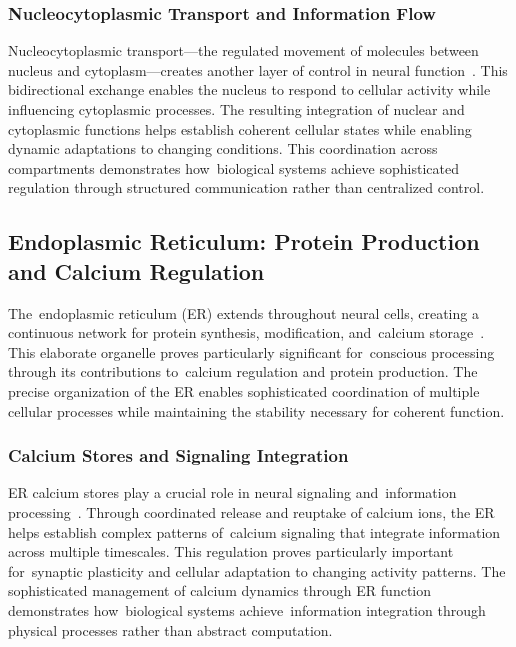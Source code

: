 \subsubsection{Nucleocytoplasmic Transport and Information Flow~~}

Nucleocytoplasmic transport—the regulated movement of molecules between nucleus and cytoplasm—creates another layer of control in neural function~\cite{Freibaum2015, Raices2012}. This bidirectional exchange enables the nucleus to respond to cellular activity while influencing cytoplasmic processes. The resulting integration of nuclear and cytoplasmic functions helps establish coherent cellular states while enabling dynamic adaptations to changing conditions. This coordination across compartments demonstrates how~biological systems achieve sophisticated regulation through structured communication rather than centralized control.

\subsection*{Endoplasmic Reticulum: Protein Production and Calcium Regulation~~}

The~endoplasmic reticulum (ER) extends throughout neural cells, creating a continuous network for protein synthesis, modification, and~calcium storage~\cite{Ramirez2011, Park2008}. This elaborate organelle proves particularly significant for~conscious processing through its contributions to~calcium regulation and protein production. The precise organization of the ER enables sophisticated coordination of multiple cellular processes while maintaining the stability necessary for coherent function.

\subsubsection{Calcium Stores and Signaling Integration~~}

ER calcium stores play a crucial role in neural signaling and~information processing~\cite{Berridge2014, Patel2010}. Through coordinated release and reuptake of calcium ions, the ER helps establish complex patterns of~calcium signaling that integrate information across multiple timescales. This regulation proves particularly important for~synaptic plasticity and cellular adaptation to changing activity patterns. The sophisticated management of calcium dynamics through ER function demonstrates how~biological systems achieve~information integration through physical processes rather than abstract computation.

